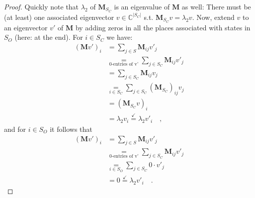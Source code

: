 \documentclass[../../main.tex]{subfiles}
\begin{document}
\begin{proof}
        Quickly note that $\lambda_2$ of $\bm{M}_{S_C}$ is an eigenvalue of $\bm{M}$ as well: There must be (at least) one associated eigenvector $v \in \mathbb{C}^{|S_C|}$ s.t. $\bm{M}_{S_C} v = \lambda_2 v$. Now, extend $v$ to an eigenvector $v'$ of $\bm{M}$ by adding zeros in all the places associated with states in $S_O$ (here: at the end). For $i \in S_C$ we have:
        \begin{align*}
            (\bm{M} v')_i &= \sum_{j \in S} \bm{M}_{ij} v'_j \\
            &\underset{\text{0-entries of v'}}{=} \sum_{j \in S_C} \bm{M}_{ij} v'_j \\
            &= \sum_{j \in S_C} \bm{M}_{ij} v_j \\
            &\underset{i \in S_C}{=} \sum_{j \in S_C} (\bm{M}_{S_C})_{ij} v_j \\
            &= (\bm{M}_{S_C} v)_i \\
            &= \lambda_2 v_i \overset{\checkmark}{=} \lambda_2 v'_i \quad ,
        \end{align*}
        and for $i \in S_O$ it follows that
        \begin{align*}
            (\bm{M} v')_i &= \sum_{j \in S} \bm{M}_{ij} v'_j \\
            &\underset{\text{0-entries of v'}}{=} \sum_{j \in S_C} \bm{M}_{ij} v'_j \\
            &\underset{i \in S_O}{=} \sum_{j \in S_C} 0 \cdot v'_j \\
            &= 0 \overset{\checkmark}{=} \lambda_2 v'_i \quad .
        \end{align*}


\end{proof}
\end{document}

